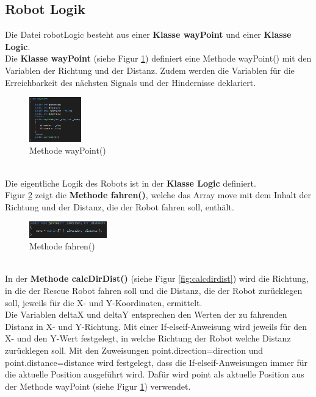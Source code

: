 \subsection{Robot Logik}
\label{robotlogic}

Die Datei robotLogic besteht aus einer \textbf{Klasse wayPoint} und einer \textbf{Klasse Logic}.\\
Die \textbf{Klasse wayPoint} (siehe Figur \ref{fig:waypoint}) definiert eine Methode wayPoint() mit den Variablen der Richtung und der Distanz. Zudem werden die Variablen für die Erreichbarkeit des nächsten Signals und der Hindernisse deklariert.
\begin{figure}[htbp] 
  \centering
     \includegraphics[width=0.2\textwidth]{Bilder/wayPoint.PNG}
  \caption{Methode wayPoint()}
  \label{fig:waypoint}
\end{figure}\\
Die eigentliche Logik des Robots ist in der \textbf{Klasse Logic} definiert. \\
Figur \ref{fig:fahren} zeigt die \textbf{Methode fahren()}, welche das Array move mit dem Inhalt der Richtung und der Distanz, die der Robot fahren soll, enthält.
\begin{figure}[htbp] 
  \centering
     \includegraphics[width=0.3\textwidth]{Bilder/fahren.PNG}
  \caption{Methode fahren()}
  \label{fig:fahren}
\end{figure}\\
In der \textbf{Methode calcDirDist()} (siehe Figur \ref{fig:calcdirdist}) wird die Richtung, in die der Rescue Robot fahren soll und die Distanz, die der Robot zurücklegen soll, jeweils für die X- und Y-Koordinaten, ermittelt.\\
Die Variablen deltaX und deltaY entsprechen den Werten der zu fahrenden Distanz in X- und Y-Richtung. Mit einer If-elseif-Anweisung wird jeweils für den X- und den Y-Wert festgelegt, in welche Richtung der Robot welche Distanz zurücklegen soll. Mit den Zuweisungen point.direction=direction und point.distance=distance wird festgelegt, dass die If-elseif-Anweisungen immer für die aktuelle Position ausgeführt wird. Dafür wird point als aktuelle Position aus der Methode wayPoint (siehe Figur \ref{fig:waypoint}) verwendet.

